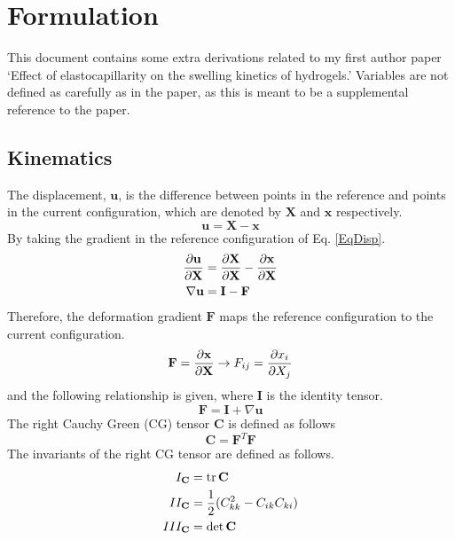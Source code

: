 \documentclass[12pt,3p]{article}
\numberwithin{equation}{section}
\begin{document}
\section{Formulation}
\vspace{-2ex}
This document contains some extra derivations related to my first author paper `Effect of elastocapillarity on the swelling kinetics of hydrogels.' Variables are not defined as carefully as in the paper, as this is meant to be a supplemental reference to the paper. 

\subsection{Kinematics}
\vspace{-1ex}
The displacement, $\mathbf{u}$, is the difference between points in the reference and points in the current configuration, which are denoted by $\mathbf{X}$ and $\mathbf{x}$ respectively. 
\begin{equation}\label{EqDisp}
\mathbf{u} = \mathbf{X} - \mathbf{x}
\end{equation}
By taking the gradient in the reference configuration of Eq. \ref{EqDisp}.
\begin{align*}
\pdv{\mathbf{u}}{\mathbf{X}} 
	&= \pdv{\mathbf{X}}{\mathbf{X}} - \pdv{\mathbf{x}}{\mathbf{X}} \\
\nabla \mathbf{u}
	&= \mathbf{I} - \mathbf{F}
\end{align*}
Therefore, the deformation gradient $\mathbf{F}$ maps the reference configuration to the current configuration. 
\begin{equation}\label{EqDefGrad}
\mathbf{F} = \pdv{\mathbf{x}}{\mathbf{X}} \rightarrow F_{ij} = \pdv{x_i}{X_j}
\end{equation}
and the following relationship is given, where $\mathbf{I}$ is the identity tensor. 
\begin{equation}\label{EqDefGrad2}
\mathbf{F} = \mathbf{I} + \nabla \mathbf{u} 
\end{equation}
The right Cauchy Green (CG) tensor $\mathbf{C}$ is defined as follows
\begin{equation}\label{EqRightCG}
\mathbf{C} = \mathbf{F}^T \mathbf{F}
\end{equation}
The invariants of the right CG tensor are defined as follows.
\begin{align*}
I_\mathbf{C} &= \tr \mathbf{C} \\
II_\mathbf{C} &= \frac{1}{2} (C_{kk}^2 - C_{ik} C_{ki}) \\
III_\mathbf{C} &= \det \mathbf{C} 
\end{align*}
\end{document}
